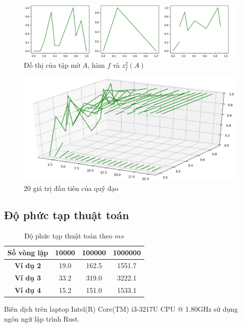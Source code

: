 \documentclass[../report.tex]{subfiles}
\begin{document}
\begin{figure}[H]
\includegraphics[width=\textwidth]{figures/example4.png}
\caption{Đồ thị của tập mờ $A$, hàm $f$ và $z_f^2(A)$}
\label{fig:7}
\end{figure}

\begin{figure}[H]
\includegraphics[width=\textwidth]{figures/example4_3d.png}
\caption{20 giá trị đầu tiên của quỹ đạo}
\label{fig:8}
\end{figure}

\subsection{Độ phức tạp thuật toán}

\begin{table}[H]
    
\caption{Độ phức tạp thuật toán theo $ms$}
\begin{center}
\begin{tabular}{|c|c|c|c|}
\hline
Số vòng lặp & 10000 & 100000 &  1000000 \\ 
\hline
\textbf{Ví dụ 2} & 19.0 & 162.5 & 1551.7 \\
\textbf{Ví dụ 3} & 33.2 & 319.0 & 3222.1 \\
\textbf{Ví dụ 4} & 15.2 & 151.0 & 1533.1 \\
\hline
\end{tabular}
\end{center}

\end{table}
Biên dịch trên laptop Intel(R) Core(TM) i3-3217U CPU @ 1.80GHz sử dụng
ngôn ngữ lập trình Rust.
\end{document}
